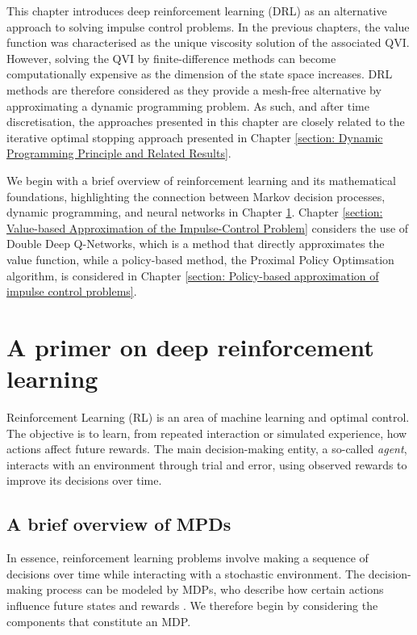 \label{section: Deep Reinforcement Learning for Impulse Control Problems}
This chapter introduces deep reinforcement learning (DRL) as an alternative approach to solving impulse control problems. In the previous chapters, the value function was characterised as the unique viscosity solution of the associated QVI. However, solving the QVI by finite-difference methods can become computationally expensive as the dimension of the state space increases. DRL methods are therefore considered as they provide a mesh-free alternative by approximating a dynamic programming problem. As such, and after time discretisation, the approaches presented in this chapter are closely related to the iterative optimal stopping approach presented in Chapter \ref{section: Dynamic Programming Principle and Related Results}. 

We begin with a brief overview of reinforcement learning and its mathematical foundations, highlighting the connection between Markov decision processes, dynamic programming, and neural networks in Chapter \ref{section: A Primer on Deep Reinforcement Learning}. Chapter \ref{section: Value-based Approximation of the Impulse-Control Problem} considers the use of Double Deep Q-Networks, which is a method that directly approximates the value function, while a policy-based method, the Proximal Policy Optimsation algorithm, is considered in Chapter \ref{section: Policy-based approximation of impulse control problems}. 

\section{A primer on deep reinforcement learning}
\label{section: A Primer on Deep Reinforcement Learning}
Reinforcement Learning (RL) is an area of machine learning and optimal control. The objective is to learn, from repeated interaction or simulated experience, how actions affect future rewards. The main decision-making entity, a so-called \emph{agent}, interacts with an environment through trial and error, using observed rewards to improve its decisions over time.

\subsection{A brief overview of MPDs}
In essence, reinforcement learning problems involve making a sequence of decisions over time while interacting with a stochastic environment. The decision-making process can be modeled by MDPs, who describe how certain actions influence future states and rewards \cite{bellman1957dynamic}. We therefore begin by considering the components that constitute an MDP. 

